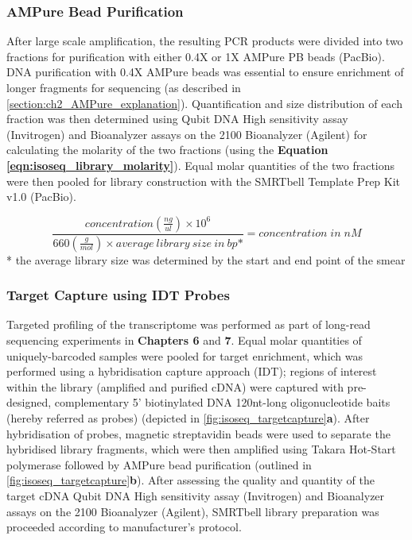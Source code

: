 \subsubsection{AMPure Bead Purification} 
After large scale amplification, the resulting PCR products were divided into two fractions for purification with either 0.4X or 1X AMPure PB beads (PacBio). DNA purification with 0.4X AMPure beads was essential to ensure enrichment of longer fragments for sequencing (as described in \cref{section:ch2_AMPure_explanation}). Quantification and size distribution of each fraction was then determined using Qubit DNA High sensitivity assay (Invitrogen) and Bioanalyzer assays on the 2100 Bioanalyzer (Agilent) for calculating the molarity of the two fractions (using the \textbf{Equation \ref{eqn:isoseq_library_molarity}}). Equal molar quantities of the two fractions were then pooled for library construction with the SMRTbell Template Prep Kit v1.0 (PacBio). 

\begin{equation}
	\label{eqn:isoseq_library_molarity}
	\frac{concentration(\frac{ng}{ul})\times 10^6}{660(\frac{g}{mol}) \times average\:library\:size\:in\:bp\mbox{*}} = concentration\;in\; nM
\end{equation}
* the average library size was determined by the start and end point of the smear

\subsubsection{Target Capture using IDT Probes} 
\label{section:ch2_targetcapture_explanation} 
Targeted profiling of the transcriptome was performed as part of long-read sequencing experiments in \textbf{Chapters 6} and \textbf{7}. Equal molar quantities of uniquely-barcoded samples were pooled for target enrichment, which was performed using a hybridisation capture approach (IDT); regions of interest within the library (amplified and purified cDNA) were captured with pre-designed, complementary 5’ biotinylated DNA 120nt-long oligonucleotide baits (hereby referred as probes) (depicted in \cref{fig:isoseq_targetcapture}\textbf{a}). After hybridisation of probes, magnetic streptavidin beads were used to separate the hybridised library fragments, which were then amplified using Takara Hot-Start polymerase followed by AMPure bead purification (outlined in \cref{fig:isoseq_targetcapture}\textbf{b}). After assessing the quality and quantity of the target cDNA  Qubit DNA High sensitivity assay (Invitrogen) and Bioanalyzer assays on the 2100 Bioanalyzer (Agilent), SMRTbell library preparation was proceeded according to manufacturer's protocol.  

